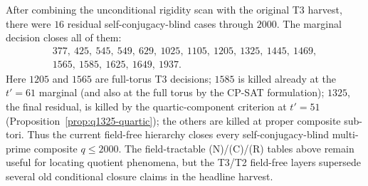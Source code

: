 \documentclass[11pt]{article}
\theoremstyle{plain}
\theoremstyle{definition}
\theoremstyle{remark}
\begin{document}
After combining the unconditional rigidity scan with the original T3 harvest,
there were $16$ residual self-conjugacy-blind cases through $2000$. The marginal
decision closes all of them:
\[
\begin{gathered}
377,\ 425,\ 545,\ 549,\ 629,\ 1025,\ 1105,\ 1205,\ 1325,\ 1445,\ 1469,\\
1565,\ 1585,\ 1625,\ 1649,\ 1937 .
\end{gathered}
\]
Here $1205$ and $1565$ are full-torus T3 decisions; $1585$ is killed already at
the $t'=61$ marginal (and also at the full torus by the CP-SAT formulation);
$1325$, the final residual, is killed by the quartic-component criterion at
$t'=51$ (Proposition~\ref{prop:q1325-quartic}); the others are killed at proper
composite sub-tori. Thus the current field-free hierarchy closes every
self-conjugacy-blind multi-prime composite $q\le2000$.
The field-tractable (N)/(C)/(R) tables above remain useful for locating quotient
phenomena, but the T3/T2 field-free layers supersede several old conditional
closure claims in the headline harvest.
\end{document}
